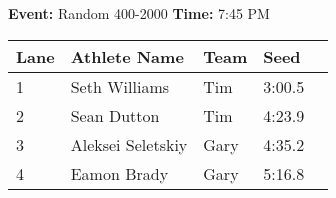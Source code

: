 \documentclass[10pt]{article}
\begin{document}
\textbf{Event:} Random 400-2000 \quad \textbf{Time:} 7:45 PM 

\vspace{1em}
\begin{tabular}{@{}lllll@{}}
\toprule

\textbf{Lane} & \textbf{Athlete Name} & \textbf{Team} & \textbf{Seed} \\
\midrule
1 & Seth Williams & Tim & 3:00.5 &\\
2 & Sean Dutton & Tim & 4:23.9 &\\
3 & Aleksei Seletskiy & Gary & 4:35.2 &\\
4 & Eamon Brady & Gary & 5:16.8 &\\
\bottomrule
\end{tabular}
\vspace{2.5em}
\end{document}
